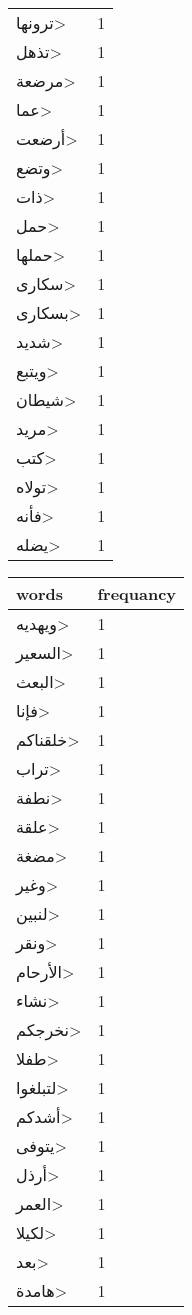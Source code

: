 \documentclass{article}
\begin{document}
\begin{multicols}{3}
\begin{center}
\begin{tabular}{ P{2cm}  P{1cm}}
\<ترونها> & 1 \\ 
\<تذهل> & 1 \\ 
\<مرضعة> & 1 \\ 
\<عما> & 1 \\ 
\<أرضعت> & 1 \\ 
\<وتضع> & 1 \\ 
\<ذات> & 1 \\ 
\<حمل> & 1 \\ 
\<حملها> & 1 \\ 
\<سكارى> & 1 \\ 
\<بسكارى> & 1 \\ 
\<شديد> & 1 \\ 
\<ويتبع> & 1 \\ 
\<شيطان> & 1 \\ 
\<مريد> & 1 \\ 
\<كتب> & 1 \\ 
\<تولاه> & 1 \\ 
\<فأنه> & 1 \\ 
\<يضله> & 1 \\ 
\end{tabular} 
\begin{tabular}{ P{2cm}  P{1cm}} 
\textbf{words}    & \textbf{frequancy}  \\
\hline
\<ويهديه> & 1 \\ 
\<السعير> & 1 \\ 
\<البعث> & 1 \\ 
\<فإنا> & 1 \\ 
\<خلقناكم> & 1 \\ 
\<تراب> & 1 \\ 
\<نطفة> & 1 \\ 
\<علقة> & 1 \\ 
\<مضغة> & 1 \\ 
\<وغير> & 1 \\ 
\<لنبين> & 1 \\ 
\<ونقر> & 1 \\ 
\<الأرحام> & 1 \\ 
\<نشاء> & 1 \\ 
\<نخرجكم> & 1 \\ 
\<طفلا> & 1 \\ 
\<لتبلغوا> & 1 \\ 
\<أشدكم> & 1 \\ 
\<يتوفى> & 1 \\ 
\<أرذل> & 1 \\ 
\<العمر> & 1 \\ 
\<لكيلا> & 1 \\ 
\<بعد> & 1 \\ 
\<هامدة> & 1 \\ 

\end{tabular}
\end{center}
\end{multicols}
\end{document}
